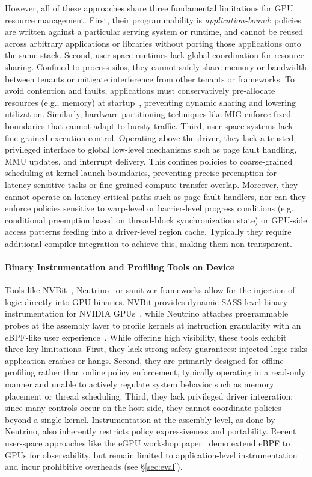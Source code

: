 However, all of these approaches share three fundamental limitations for GPU resource management. First, their programmability is \emph{application-bound}: policies are written against a particular serving system or runtime, and cannot be reused across arbitrary applications or libraries without porting those applications onto the same stack. Second, user-space runtimes lack global coordination for resource sharing. Confined to process silos, they cannot safely share memory or bandwidth between tenants or mitigate interference from other tenants or frameworks. To avoid contention and faults, applications must conservatively pre-allocate resources (e.g., memory) at startup~\cite{lmcache}, preventing dynamic sharing and lowering utilization. Similarly, hardware partitioning techniques like MIG enforce fixed boundaries that cannot adapt to bursty traffic. Third, user-space systems lack fine-grained execution control. Operating above the driver, they lack a trusted, privileged interface to global low-level mechanisms such as page fault handling, MMU updates, and interrupt delivery. This confines policies to coarse-grained scheduling at kernel launch boundaries, preventing precise preemption for latency-sensitive tasks or fine-grained compute-transfer overlap. Moreover, they cannot operate on latency-critical paths such as page fault handlers, nor can they enforce policies sensitive to warp-level or barrier-level progress conditions (e.g., conditional preemption based on thread-block synchronization state) or GPU-side access patterns feeding into a driver-level region cache. Typically they require additional compiler integration to achieve this, making them non-transparent.

\paragraph{Binary Instrumentation and Profiling Tools on Device}
Tools like NVBit~\cite{nvbit}, Neutrino~\cite{neutrino} or sanitizer frameworks allow for the injection of logic directly into GPU binaries. NVBit provides dynamic SASS-level binary instrumentation for NVIDIA GPUs~\cite{nvbit}, while Neutrino attaches programmable probes at the assembly layer to profile kernels at instruction granularity with an eBPF-like user experience~\cite{neutrino}. While offering high visibility, these tools exhibit three key limitations. First, they lack strong safety guarantees: injected logic risks application crashes or hangs. Second, they are primarily designed for offline profiling rather than online policy enforcement, typically operating in a read-only manner and unable to actively regulate system behavior such as memory placement or thread scheduling. Third, they lack privileged driver integration; since many controls occur on the host side, they cannot coordinate policies beyond a single kernel. Instrumentation at the assembly level, as done by Neutrino, also inherently restricts policy expressiveness and portability. Recent user-space approaches like the eGPU workshop paper~\cite{egpu} demo extend eBPF to GPUs for observability, but remain limited to application-level instrumentation and incur prohibitive overheads (see \S\ref{sec:eval}).

